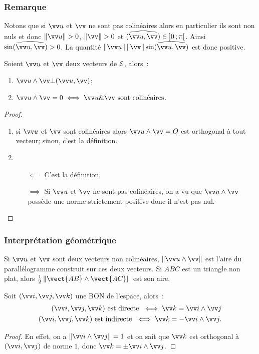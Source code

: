 \subsubsection{Remarque}
Notons que si $\vu$ et $\vv$ ne sont pas colinéaires alors en particulier ils sont non nuls et donc $\norme{\vu}>0$, $\norme{\vv}>0$ et $(\widehat{\vu,\vv})\in \intervalleoo{0}{\pi}$. Ainsi $\sin(\widehat{\vu,\vv})>0$. La quantité $\norme{\vu}\norme{\vv}\sin(\widehat{\vu,\vv})$ est donc positive.
\begin{prop}
  \label{prop:1}
  Soient $\vu$ et $\vv$ deux vecteurs de $\mathcal{E}$, alors~:
  \begin{enumerate}
  \item $\vu \wedge \vv \bot (\vu,\vv)$;
  \item $\vu \wedge \vv = 0 \iff \vu \& \vv \text{ sont colinéaires}$.
  \end{enumerate}
\end{prop}
\begin{proof}
  \begin{enumerate}
  \item si $\vu$ et $\vv$ sont colinéaires alors $\vu \wedge \vv = O$ est orthogonal à tout vecteur; sinon, c'est la définition.
  \item
    \begin{itemize}
    \item[$\impliedby$] C'est la définition.
    \item[$\implies$] Si $\vu$ et $\vv$ ne sont pas colinéaires, on a vu que $\vu \wedge \vv$ possède une norme strictement positive donc il n'est pas nul.\qedhere
    \end{itemize}
  \end{enumerate}
\end{proof}

\subsubsection{Interprétation géométrique}
Si $\vu$ et $\vv$ sont deux vecteurs non colinéaires, $\norme{\vu\wedge\vv}$ est l'aire du parallélogramme construit sur ces deux vecteurs. Si $ABC$ est un triangle non plat, alors $\frac{1}{2}\norme{\vect{AB}\wedge\vect{AC}}$ est son aire.
\begin{prop}
  Soit $\bondtrois$ une BON de l'espace, alors~:
  \begin{align}
    \bondtrois\text{~est directe~}\iff \vk=\vi\wedge\vj\\
    \bondtrois\text{~est indirecte~}\iff \vk=-\vi\wedge\vj.
  \end{align}
\end{prop}
\begin{proof}
  En effet, on a $\norme{\vi\wedge\vj}=1$ et on sait que $\vk$ est orthogonal à $(\vi,\vj)$ de norme $1$, donc $\vk=\pm\vi\wedge\vj$.  
\end{proof}

